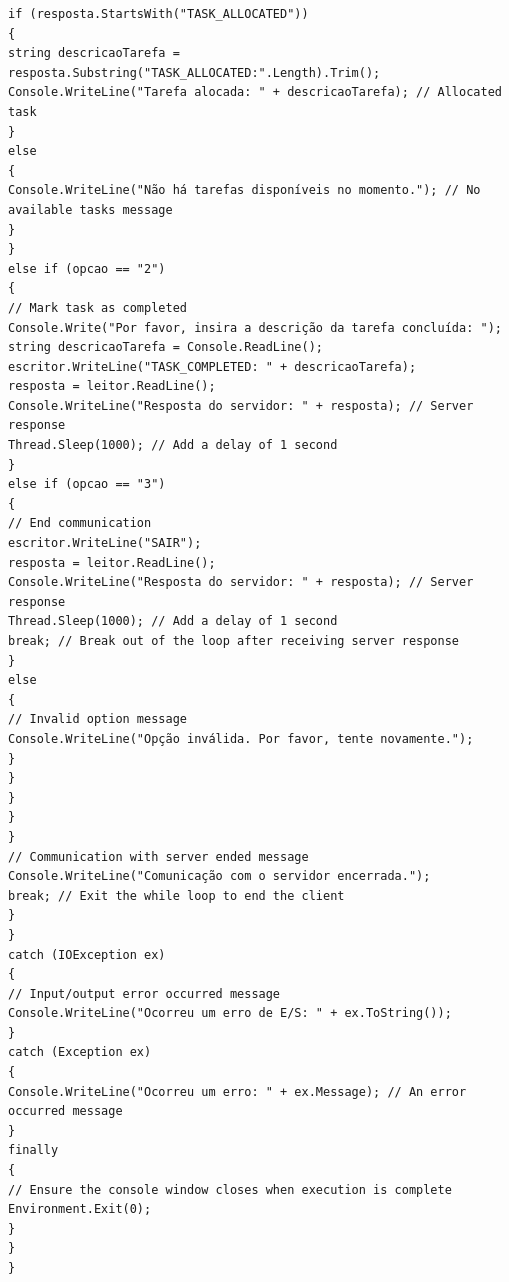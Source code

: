 \documentclass[12pt]{article}
\begin{document}
\begin{verbatim}
if (resposta.StartsWith("TASK_ALLOCATED"))
{
string descricaoTarefa = resposta.Substring("TASK_ALLOCATED:".Length).Trim();
Console.WriteLine("Tarefa alocada: " + descricaoTarefa); // Allocated task
}
else
{
Console.WriteLine("Não há tarefas disponíveis no momento."); // No available tasks message
}
}
else if (opcao == "2")
{
// Mark task as completed
Console.Write("Por favor, insira a descrição da tarefa concluída: ");
string descricaoTarefa = Console.ReadLine();
escritor.WriteLine("TASK_COMPLETED: " + descricaoTarefa);
resposta = leitor.ReadLine();
Console.WriteLine("Resposta do servidor: " + resposta); // Server response
Thread.Sleep(1000); // Add a delay of 1 second
}
else if (opcao == "3")
{
// End communication
escritor.WriteLine("SAIR");
resposta = leitor.ReadLine();
Console.WriteLine("Resposta do servidor: " + resposta); // Server response
Thread.Sleep(1000); // Add a delay of 1 second
break; // Break out of the loop after receiving server response
}
else
{
// Invalid option message
Console.WriteLine("Opção inválida. Por favor, tente novamente.");
}
}
}
}
}
// Communication with server ended message
Console.WriteLine("Comunicação com o servidor encerrada.");
break; // Exit the while loop to end the client
}
}
catch (IOException ex)
{
// Input/output error occurred message
Console.WriteLine("Ocorreu um erro de E/S: " + ex.ToString()); 
}
catch (Exception ex)
{
Console.WriteLine("Ocorreu um erro: " + ex.Message); // An error occurred message
}
finally
{
// Ensure the console window closes when execution is complete
Environment.Exit(0);
}
}
}

\end{verbatim}
\end{document}

